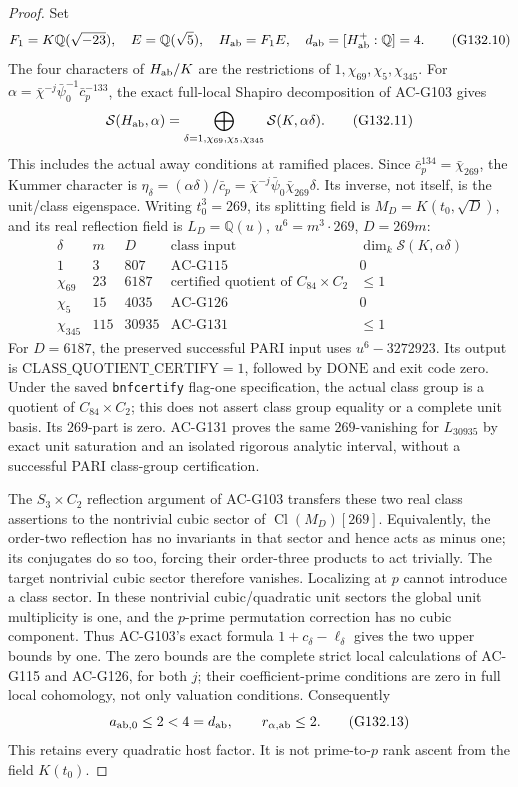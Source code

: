 \begin{proof}
Set
\[
 F_1=K\mathbb Q(\sqrt{-23}),\quad E=\mathbb Q(\sqrt5),\quad
 H_{\rm ab}=F_1E,\quad d_{\rm ab}=[H_{\rm ab}^+:\mathbb Q]=4.
 \tag{G132.10}
\]
The four characters of \(H_{\rm ab}/K\) are the restrictions of
\(1,\chi_{69},\chi_5,\chi_{345}\).  For
\(\alpha=\bar\chi^{-j}\bar\psi_0^{-1}\bar c_p^{-133}\),
the exact full-local Shapiro decomposition of AC-G103 gives
\[
 \mathcal S(H_{\rm ab},\alpha)
   =\bigoplus_{\delta=1,\chi_{69},\chi_5,\chi_{345}}
                         \mathcal S(K,\alpha\delta).
 \tag{G132.11}
\]
This includes the actual away conditions at ramified places.
Since \(\bar c_p^{134}=\bar\chi_{269}\), the Kummer character
is
\(\eta_\delta=(\alpha\delta)/\bar c_p
 =\bar\chi^{-j}\bar\psi_0\bar\chi_{269}\delta\).
Its inverse, not itself, is the unit/class eigenspace.
Writing \(t_0^3=269\), its splitting field is
\(M_D=K(t_0,\sqrt D)\), and its real reflection field is
\(L_D=\mathbb Q(u)\), \(u^6=m^3\cdot269\), \(D=269m\):
\[
\begin{array}{c|r|r|c|c}
\delta&m&D&\text{class input}&\dim_k\mathcal S(K,\alpha\delta)\\\hline
1&3&807&\text{AC-G115}&0\\
\chi_{69}&23&6187&\text{certified quotient of }C_{84}\times C_2&\le1\\
\chi_5&15&4035&\text{AC-G126}&0\\
\chi_{345}&115&30935&\text{AC-G131}&\le1
\end{array}
\tag{G132.12}
\]
For \(D=6187\), the preserved successful PARI input uses
\(u^6-3272923\).  Its output is
\(\mathrm{CLASS\_QUOTIENT\_CERTIFY}=1\), followed by
\(\mathrm{DONE}\) and exit code zero.  Under the saved
\texttt{bnfcertify} flag-one specification, the actual class group
is a quotient of \(C_{84}\times C_2\); this does not assert class
group equality or a complete unit basis.  Its \(269\)-part is zero.
AC-G131 proves the same \(269\)-vanishing for \(L_{30935}\)
by exact unit saturation and an isolated rigorous analytic interval,
without a successful PARI class-group certification.

The \(S_3\times C_2\) reflection argument of AC-G103 transfers
these two real class assertions to the nontrivial cubic sector of
\(\operatorname{Cl}(M_D)[269]\).  Equivalently, the order-two
reflection has no invariants in that sector and hence acts as
minus one; its conjugates do so too, forcing their order-three
products to act trivially.  The target nontrivial cubic sector
therefore vanishes.  Localizing at \(p\) cannot introduce a class
sector.  In these nontrivial cubic/quadratic unit sectors the
global unit multiplicity is one, and the \(p\)-prime permutation
correction has no cubic component.  Thus AC-G103's exact formula
\(1+c_\delta-\ell_\delta\) gives the two upper bounds by one.
The zero bounds are the complete strict local calculations of
AC-G115 and AC-G126, for both \(j\); their coefficient-prime
conditions are zero in full local cohomology, not only valuation
conditions.  Consequently
\[
 a_{{\rm ab},0}\le2<4=d_{\rm ab},\qquad r_{\alpha,{\rm ab}}\le2 .
 \tag{G132.13}
\]
This retains every quadratic host factor.  It is not
prime-to-\(p\) rank ascent from the field \(K(t_0)\).


\end{proof}
